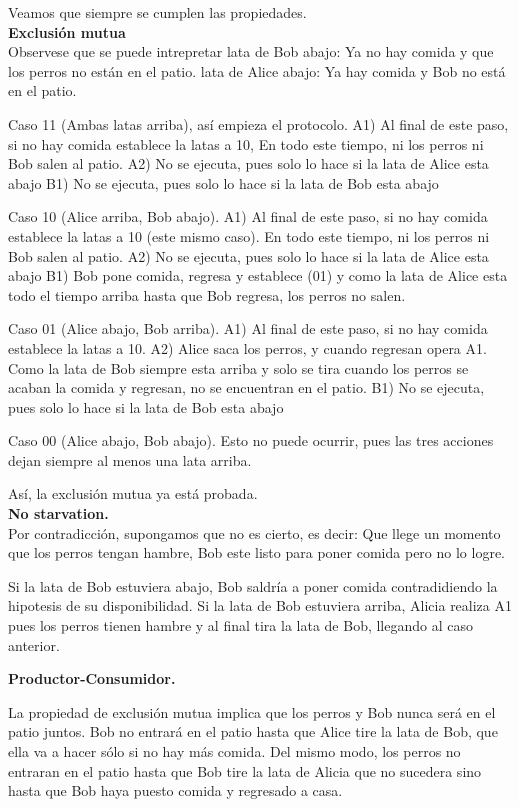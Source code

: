 \documentclass{article}
\begin{document}
\begin{enumerate}
Veamos que siempre se cumplen las propiedades.\\

{\bf Exclusión mutua}\\
Observese que se puede intrepretar 
lata de Bob abajo: Ya no hay comida y que los perros no están en el patio.
lata de Alice abajo: Ya hay comida y Bob no está en el patio.

Caso 11 (Ambas latas arriba), así empieza el protocolo.
     A1) Al final de este paso, si no hay comida establece la latas a 10, 
         En todo este tiempo, ni los perros ni Bob salen al patio.
     A2) No se ejecuta, pues solo lo hace si la lata de Alice esta abajo
     B1) No se ejecuta, pues solo lo hace si la lata de Bob esta abajo

Caso 10 (Alice arriba, Bob abajo).
     A1) Al final de este paso, si no hay comida establece la latas a 10 (este mismo caso).
         En todo este tiempo, ni los perros ni Bob salen al patio.
     A2) No se ejecuta, pues solo lo hace si la lata de Alice esta abajo
     B1) Bob pone comida, regresa y establece (01)
         y como la lata de Alice esta todo el tiempo arriba hasta que Bob regresa, los perros no salen.

Caso 01 (Alice abajo, Bob arriba).
     A1) Al final de este paso, si no hay comida establece la latas a 10.
     A2) Alice saca los perros, y cuando regresan opera A1.
         Como la lata de Bob siempre esta arriba y solo se tira cuando los perros se acaban la comida y regresan, no se encuentran en el patio.
     B1) No se ejecuta, pues solo lo hace si la lata de Bob esta abajo
         
Caso 00 (Alice abajo, Bob abajo).
     Esto no puede ocurrir, pues las tres acciones dejan siempre al menos una lata arriba.

Así, la exclusión mutua ya está probada.\\


{\bf No starvation.}\\
Por contradicción, supongamos que no es cierto, es decir:
Que llege un momento que los perros tengan hambre, Bob este listo para poner comida pero no lo logre.

Si la lata de Bob estuviera abajo, Bob saldría a poner comida contradidiendo la hipotesis de su disponibilidad.
Si la lata de Bob estuviera arriba, Alicia realiza A1 pues los perros tienen hambre y al final tira la lata de Bob, llegando al caso anterior.

{\bf Productor-Consumidor.}

La propiedad de exclusión mutua implica que los perros y Bob nunca será en el patio juntos. Bob no entrará en el patio hasta que Alice tire la lata de Bob, que ella va a hacer sólo si no hay más comida. 
Del mismo modo, los perros no entraran en el patio hasta que Bob tire la lata de Alicia que no sucedera sino hasta que Bob haya puesto comida y regresado a casa.
\end{enumerate}
\end{document}
